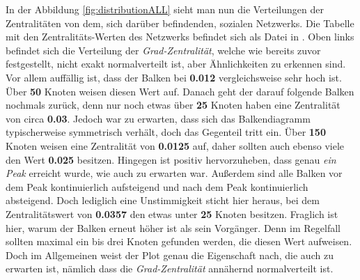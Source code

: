 In der Abbildung \ref{fig:distributionALL} sieht man nun die Verteilungen der Zentralitäten von dem, sich darüber befindenden, sozialen Netzwerks. Die Tabelle mit den Zentralitäts-Werten des Netzwerks befindet sich als Datei in \cite{TZ}. Oben links befindet sich die Verteilung der \textit{Grad-Zentralität}, welche wie bereits zuvor festgestellt, nicht exakt normalverteilt ist, aber Ähnlichkeiten zu erkennen sind. Vor allem auffällig ist, dass der Balken bei \textbf{0.012} vergleichsweise sehr hoch ist. Über \textbf{50} Knoten weisen diesen Wert auf. Danach geht der darauf folgende Balken nochmals zurück, denn nur noch etwas über \textbf{25} Knoten haben eine Zentralität von circa \textbf{0.03}. Jedoch war zu erwarten, dass sich das Balkendiagramm typischerweise symmetrisch verhält, doch das Gegenteil tritt ein. Über \textbf{150} Knoten weisen eine Zentralität von \textbf{0.0125} auf, daher sollten auch ebenso viele den Wert \textbf{0.025} besitzen. Hingegen ist positiv hervorzuheben, dass genau \textit{ein Peak} erreicht wurde, wie auch zu erwarten war. Außerdem sind alle Balken vor dem Peak kontinuierlich aufsteigend und nach dem Peak kontinuierlich absteigend. Doch lediglich eine Unstimmigkeit sticht hier heraus, bei dem Zentralitätswert von \textbf{0.0357} den etwas unter \textbf{25} Knoten besitzen. Fraglich ist hier, warum der Balken erneut höher ist als sein Vorgänger. Denn im Regelfall sollten maximal ein bis drei Knoten gefunden werden, die diesen Wert aufweisen. Doch im Allgemeinen weist der Plot genau die Eigenschaft nach, die auch zu erwarten ist, nämlich dass die \textit{Grad-Zentralität} annähernd normalverteilt ist.\\


